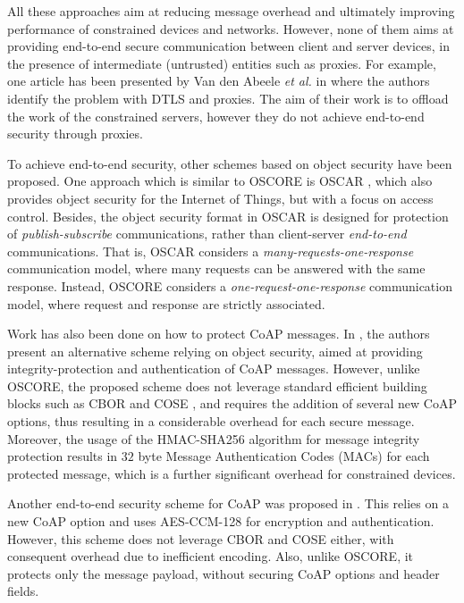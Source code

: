 {All these approaches aim at reducing message overhead and ultimately improving performance of constrained devices and networks. However, none of them aims at providing end-to-end secure communication between client and server devices, in the presence of intermediate (untrusted) entities such as proxies. For example, one article has been presented by Van den Abeele \emph{et al.} in \cite{s17071609} where the authors identify the problem with DTLS and proxies. The aim of their work is to offload the work of the constrained servers, however they do not achieve end-to-end security through proxies.

To achieve end-to-end security, other schemes based on object security have been proposed. One approach which is similar to OSCORE is OSCAR \cite{cite:OSCAR}, which also provides object security for the Internet of Things, but with a focus on access control. Besides, the object security format in OSCAR is designed for protection of \textit{publish-subscribe} communications, rather than client-server \textit{end-to-end} communications. That is, OSCAR considers a \textit{many-requests-one-response} communication model, where many requests can be answered with the same response. Instead, OSCORE considers a \textit{one-request-one-response} communication model, where request and response are strictly associated.

Work has also been done on how to protect CoAP messages. In \cite{nguyen2015}, the authors present an alternative scheme relying on object security, aimed at providing integrity-protection and authentication of CoAP messages. However, unlike OSCORE, the proposed scheme does not leverage standard efficient building blocks such as CBOR \cite{rfc7049} and COSE \cite{rfc8152}, and requires the addition of several new CoAP options, thus resulting in a considerable overhead for each secure message. Moreover, the usage of the HMAC-SHA256 algorithm for message integrity protection results in $32$ byte Message Authentication Codes (MACs) for each protected message, which is a further significant overhead for constrained devices.

Another end-to-end security scheme for CoAP was proposed in \cite{ukil2014lightweight}. This relies on a new CoAP option and uses AES-CCM-128 for encryption and authentication. However, this scheme does not leverage CBOR and COSE either, with consequent overhead due to inefficient encoding. Also, unlike OSCORE, it protects only the message payload, without securing CoAP options and header fields.

}
